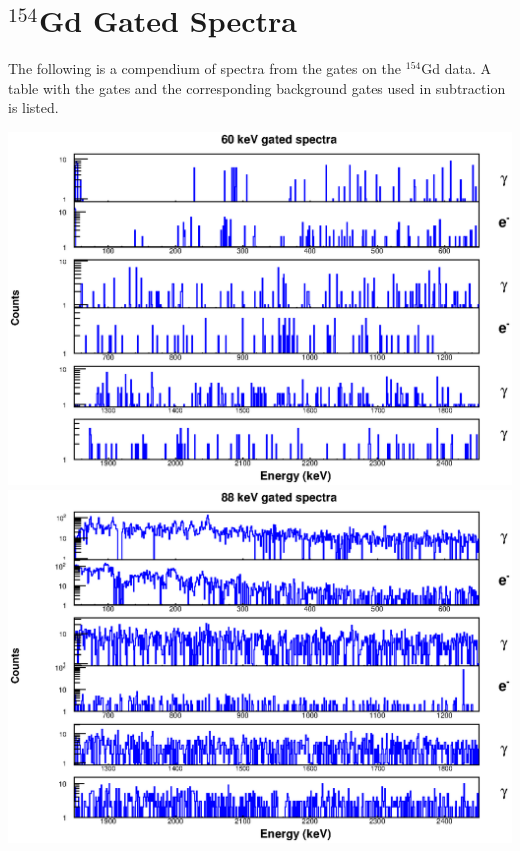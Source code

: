 
\chapter{$^{154}$Gd Gated Spectra}

The following is a compendium of spectra from the gates on the $^{154}$Gd data. A table with the gates and the corresponding background gates used in subtraction is listed.

\begin{landscape}
\includegraphics[scale=1.1]{154Gd_Appendix/60_combined.eps}
\includegraphics[scale=1.1]{154Gd_Appendix/88_combined.eps}

\end{landscape}
